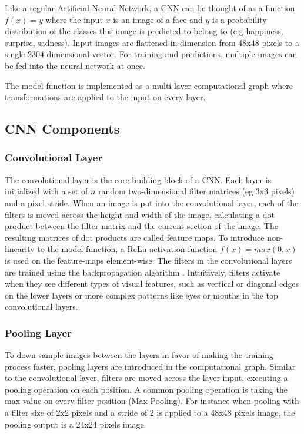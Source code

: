 \documentclass[twoside]{article}
\begin{document}
\begin{multicols}{2}
Like a regular Artificial Neural Network, a CNN can be thought of as a function $f(x) = y$ where the input $x$ is an image of a face and $y$ is a probability distribution of the classes this image is predicted to belong to (e.g happiness, surprise, sadness). Input images are flattened in dimension from 48x48 pixels to a single 2304-dimensional vector. For training and predictions, multiple images can be fed into the neural network at once.

The model function is implemented as a multi-layer computational graph where transformations are applied to the input on every layer.


\subsection{CNN Components}

\subsubsection{Convolutional Layer}
The convolutional layer is the core building block of a CNN. Each layer is initialized with a set of $n$ random two-dimensional filter matrices (eg 3x3 pixels) and a pixel-stride. When an image is put into the convolutional layer, each of the filters is moved across the height and width of the image, calculating a dot product between the filter matrix and the current section of the image. The resulting matrices of dot products are called feature maps. \cite{karpathy} To introduce non-linearity to the model function, a ReLu activation function $f(x) = max(0, x)$ is used on the feature-maps element-wise. The filters in the convolutional layers are trained using the backpropagation algorithm \cite{goodfel16}. Intuitively, filters activate when they see different types of visual features, such as vertical or diagonal edges on the lower layers or more complex patterns like eyes or mouths in the top convolutional layers.

\subsubsection{Pooling Layer}
To down-sample images between the layers in favor of making the training process faster, pooling layers are introduced in the computational graph. Similar to the convolutional layer, filters are moved across the layer input, executing a pooling operation on each position. A common pooling operation is taking the max value on every filter position (Max-Pooling). For instance when pooling with a filter size of 2x2 pixels and a stride of 2 is applied to a 48x48 pixels image, the pooling output is a 24x24 pixels image.


\end{multicols}
\end{document}
